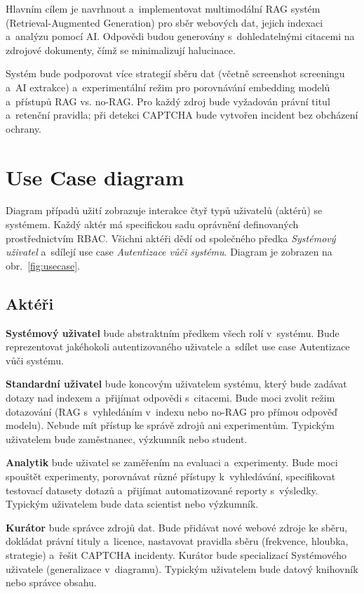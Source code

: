 \documentclass[a4paper, 11pt]{article}
\begin{document}
Hlavním cílem je navrhnout a~implementovat multimodální RAG systém (Retrieval-Augmented Generation) pro sběr webových dat, jejich indexaci a~analýzu pomocí AI. Odpovědi budou generovány s~dohledatelnými citacemi na zdrojové dokumenty, čímž se minimalizují halucinace.

Systém bude podporovat více strategií sběru dat (včetně screenshot screeningu a~AI extrakce) a~experimentální režim pro porovnávání embedding modelů a~přístupů RAG vs. no-RAG. Pro každý zdroj bude vyžadován právní titul a~retenční pravidla; při detekci CAPTCHA bude vytvořen incident bez obcházení ochrany.

\newpage
\section{Use Case diagram}

Diagram případů užití zobrazuje interakce čtyř typů uživatelů (aktérů) se systémem. Každý aktér má specifickou sadu oprávnění definovaných prostřednictvím RBAC. Všichni aktéři dědí od společného předka \textit{Systémový uživatel} a~sdílejí use case \textit{Autentizace vůči systému}. Diagram je zobrazen na obr.~\ref{fig:usecase}.

\subsection{Aktéři}

\textbf{Systémový uživatel} bude abstraktním předkem všech rolí v~systému. Bude reprezentovat jakéhokoli autentizovaného uživatele a~sdílet use case Autentizace vůči systému.

\textbf{Standardní uživatel} bude koncovým uživatelem systému, který bude zadávat dotazy nad indexem a~přijímat odpovědi s~citacemi. Bude moci zvolit režim dotazování (RAG s~vyhledáním v~indexu nebo no-RAG pro přímou odpověď modelu). Nebude mít přístup ke správě zdrojů ani experimentům. Typickým uživatelem bude zaměstnanec, výzkumník nebo student.

\textbf{Analytik} bude uživatel se zaměřením na evaluaci a~experimenty. Bude moci spouštět experimenty, porovnávat různé přístupy k~vyhledávání, specifikovat testovací datasety dotazů a~přijímat automatizované reporty s~výsledky. Typickým uživatelem bude data scientist nebo výzkumník.

\textbf{Kurátor} bude správce zdrojů dat. Bude přidávat nové webové zdroje ke sběru, dokládat právní tituly a~licence, nastavovat pravidla sběru (frekvence, hloubka, strategie) a~řešit CAPTCHA incidenty. Kurátor bude specializací Systémového uživatele (generalizace v~diagramu). Typickým uživatelem bude datový knihovník nebo správce obsahu.
\end{document}
